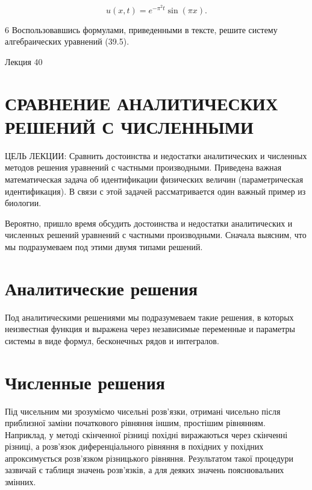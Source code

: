 \documentclass[
  ukrainian,
]{article}
\begin{document}
\[
u(x, t) = e^{-\pi^2 t} \sin(\pi x).
\]

6 Воспользовавшись формулами, приведенными в тексте, решите систему
алгебраических уравнений (39.5).

Лекция 40

\section{СРАВНЕНИЕ АНАЛИТИЧЕСКИХ РЕШЕНИЙ С
ЧИСЛЕННЫМИ}\label{ux441ux440ux430ux432ux43dux435ux43dux438ux435-ux430ux43dux430ux43bux438ux442ux438ux447ux435ux441ux43aux438ux445-ux440ux435ux448ux435ux43dux438ux439-ux441-ux447ux438ux441ux43bux435ux43dux43dux44bux43cux438}

ЦЕЛЬ ЛЕКЦИИ: Сравнить достоинства и недостатки аналитических и численных
методов решения уравнений с частными производными. Приведена важная
математическая задача об идентификации физических величин
(параметрическая идентификация). В связи с этой задачей рассматривается
один важный пример из биологии.

Вероятно, пришло время обсудить достоинства и недостатки аналитических и
численных решений уравнений с частными производными. Сначала выясним,
что мы подразумеваем под этими двумя типами решений.

\section{Аналитические
решения}\label{ux430ux43dux430ux43bux438ux442ux438ux447ux435ux441ux43aux438ux435-ux440ux435ux448ux435ux43dux438ux44f}

Под аналитическими решениями мы подразумеваем такие решения, в которых
неизвестная функция и выражена через независимые переменные и параметры
системы в виде формул, бесконечных рядов и интегралов.

\section{Численные
решения}\label{ux447ux438ux441ux43bux435ux43dux43dux44bux435-ux440ux435ux448ux435ux43dux438ux44f}

Під чисельним ми зрозуміємо чисельні розв'язки, отримані чисельно після
приблизної заміни початкового рівняння іншим, простішим рівнянням.
Наприклад, у методі скінченної різниці похідні виражаються через
скінченні різниці, а розв'язок диференціального рівняння в похідних у
похідних апроксимується розв'язком різницького рівняння. Результатом
такої процедури зазвичай є таблиця значень розв'язків, а для деяких
значень пояснювальних змінних.
\end{document}
